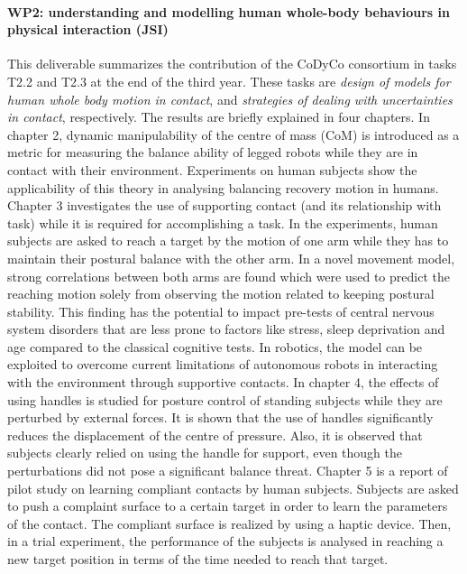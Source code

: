 






 
\paragraph*{WP2: understanding and modelling human whole-body behaviours in physical interaction (JSI)}

This deliverable summarizes the contribution of the CoDyCo consortium in tasks
T2.2 and T2.3 at the end of the third year.  These tasks are \textit{design of
	models for human whole body motion in contact}, and \textit{strategies of
	dealing with uncertainties in contact}, respectively.  The results are
briefly explained in four chapters.  In chapter 2, dynamic manipulability of
the centre of mass (CoM) is introduced as a metric for measuring the balance
ability of legged robots while they are in contact with their environment.
Experiments on human subjects show the applicability of this theory in
analysing balancing recovery motion in humans.  Chapter 3 investigates the use
of supporting contact (and its relationship with task) while it is required
for accomplishing a task.  In the experiments, human subjects are asked to
reach a target by the motion of one arm while they has to maintain their
postural balance with the other arm.  In a novel movement model, strong
correlations between both arms are found which were used to predict the
reaching motion solely from observing the motion related to keeping postural
stability. This finding has the potential to impact pre-tests of central
nervous system disorders that are less prone to factors like stress, sleep
deprivation and age compared to the classical cognitive tests.  In robotics,
the model can be exploited to overcome current limitations of autonomous
robots in interacting with the environment through supportive contacts.  In
chapter 4, the effects of using handles is studied for posture control of
standing subjects while they are perturbed by external forces.  It is shown
that the use of handles significantly reduces the displacement of the centre
of pressure.  Also, it is observed that subjects clearly relied on using the
handle for support, even though the perturbations did not pose a significant
balance threat.  Chapter 5 is a report of pilot study on learning compliant
contacts by human subjects.  Subjects are asked to push a complaint surface to
a certain target in order to learn the parameters of the contact.  The
compliant surface is realized by using a haptic device.  Then, in a trial
experiment, the performance of the subjects is analysed in reaching a new
target position in terms of the time needed to reach that target.





